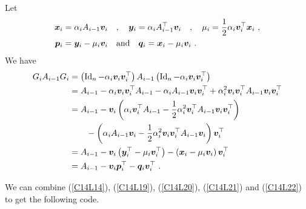 Let
\begin{equation}\label{C14L21}
\begin{split}
\bm{x}_i &= \alpha_i A_{i-1} \bm{v}_i \quad  , \quad
\bm{y}_i = \alpha_i A_{i-1}^\top \bm{v}_i \quad , \quad
\mu_i = \frac{1}{2} \alpha_i \bm{v}_i^\top \bm{x}_i \  , \\
\bm{p}_i &= \bm{y}_i - \mu_i \bm{v}_i \quad \text{and} \quad
\bm{q}_i = \bm{x}_i - \mu_i \bm{v}_i \  .
\end{split}
\end{equation}
We have
\begin{align}
G_i A_{i-1}G_i &= \left( \operatorname{Id}_n - \alpha_i \bm{v}_i \bm{v}_i^\top\right)
A_{i-1} \left( \operatorname{Id}_n - \alpha_i \bm{v}_i \bm{v}_i^\top \right) \nonumber \\
&= A_{i-1} - \alpha_i \bm{v}_i \bm{v}_i^\top A_{i-1} -
\alpha_i A_{i-1} \bm{v}_i \bm{v}_i^\top
+ \alpha_i^2 \bm{v}_i \bm{v}_i^\top A_{i-1} \bm{v}_i \bm{v}_i^\top
\nonumber \\
&= A_{i-1} - \bm{v}_i \left( \alpha_i \bm{v}_i^\top A_{i-1}
- \frac{1}{2} \alpha_i^2 \bm{v}_i^\top A_{i-1} \bm{v}_i \bm{v}_i^\top
\right) \nonumber \\
&\qquad
- \left( \alpha_i A_{i-1} \bm{v}_i
- \frac{1}{2} \alpha_i^2 \bm{v}_i \bm{v}_i^\top A_{i-1} \bm{v}_i \right)
\bm{v}_i^\top \nonumber \\
&= A_{i-1} - \bm{v}_i \left( \bm{y}_i^\top - \mu_i \bm{v}_i^\top \right)
- \left( \bm{x}_i - \mu_i \bm{v}_i \right) \bm{v}_i^\top \nonumber \\
&= A_{i-1} - \bm{v}_i \bm{p}_i^\top - \bm{q}_i \bm{v}_i^\top \  .
\label{C14L22}
\end{align}

We can combine (\ref{C14L14}), (\ref{C14L19}), (\ref{C14L20}),
(\ref{C14L21}) and (\ref{C14L22}) to get the following code.

